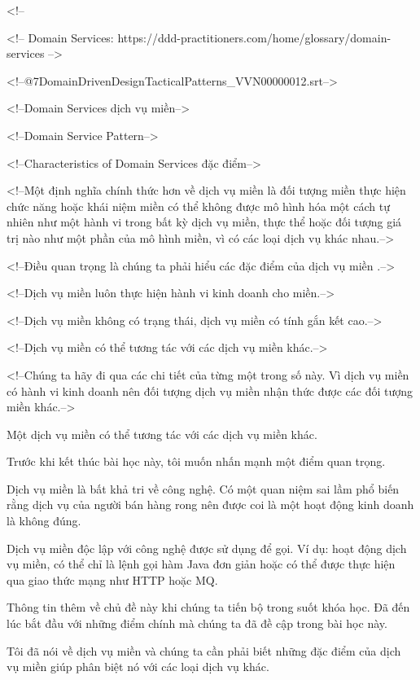 


<!-- %

<!-- Domain Services: https://ddd-practitioners.com/home/glossary/domain-services -->








<!--@\07DomainDrivenDesignTacticalPatterns_VVN\000000012.srt-->

<!--Domain Services dịch vụ miền-->

<!--Domain Service Pattern-->

<!--Characteristics of Domain Services đặc điểm-->

<!--Một định nghĩa chính thức hơn về dịch vụ miền là đối tượng miền thực hiện chức năng hoặc khái niệm miền có thể không được mô hình hóa một cách tự nhiên như một hành vi trong bất kỳ dịch vụ miền, thực thể hoặc đối tượng giá trị nào như một phần của mô hình miền, vì có các loại dịch vụ khác nhau.-->

<!--Điều quan trọng là chúng ta phải hiểu các đặc điểm của dịch vụ miền .-->

<!--Dịch vụ miền luôn thực hiện hành vi kinh doanh cho miền.-->

<!--Dịch vụ miền không có trạng thái, dịch vụ miền có tính gắn kết cao.-->

<!--Dịch vụ miền có thể tương tác với các dịch vụ miền khác.-->

<!--Chúng ta hãy đi qua các chi tiết của từng một trong số này. Vì dịch vụ miền có hành vi kinh doanh nên đối tượng dịch vụ miền nhận thức được các đối tượng miền khác.-->

Một dịch vụ miền có thể tương tác với các dịch vụ miền khác.

Trước khi kết thúc bài học này, tôi muốn nhấn mạnh một điểm quan trọng.

Dịch vụ miền là bất khả tri về công nghệ. Có một quan niệm sai lầm phổ biến rằng dịch vụ của người bán hàng rong nên được coi là một hoạt động kinh doanh là không đúng.

Dịch vụ miền độc lập với công nghệ được sử dụng để gọi. Ví dụ: hoạt động dịch vụ miền, có thể chỉ là lệnh gọi hàm Java đơn giản hoặc có thể được thực hiện qua giao thức mạng như HTTP hoặc MQ.

Thông tin thêm về chủ đề này khi chúng ta tiến bộ trong suốt khóa học. Đã đến lúc bắt đầu với những điểm chính mà chúng ta đã đề cập trong bài học này.

Tôi đã nói về dịch vụ miền và chúng ta cần phải biết những đặc điểm của dịch vụ miền giúp phân biệt nó với các loại dịch vụ khác.

